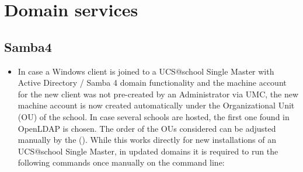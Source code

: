 
 

\section{Domain services}

\subsection{Samba4}
\begin{itemize}
\item In case a Windows client is joined to a UCS@school Single Master with Active Directory / Samba 4 domain functionality and the machine account for the new client was not pre-created by an Administrator via UMC, the new machine account is now created automatically under the Organizational Unit (OU) of the school. In case several schools are hosted, the first one found in OpenLDAP is chosen. The order of the OUs considered can be adjusted manually by the  (). While this works directly for new installations of an UCS@school Single Master, in updated domains it is required to run the following commands once manually on the command line:
\end{itemize}

